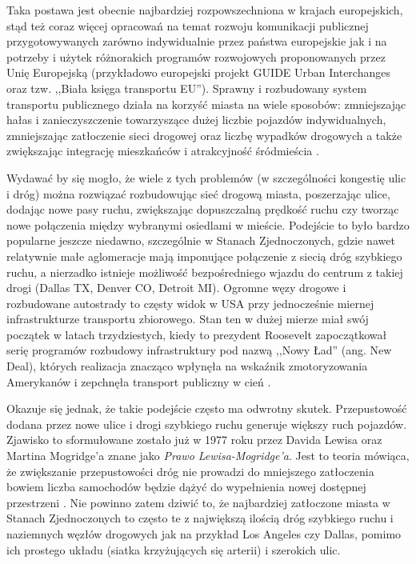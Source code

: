 \documentclass[twoside,12pt]{article}
\begin{document}
	Taka postawa jest obecnie najbardziej rozpowszechniona w krajach europejskich, stąd też coraz więcej opracowań na temat rozwoju komunikacji publicznej przygotowywanych zarówno indywidualnie przez państwa europejskie jak i na potrzeby i użytek różnorakich programów rozwojowych proponowanych przez Unię Europejską (przykładowo europejski projekt GUIDE Urban Interchanges oraz tzw. ,,Biała księga transportu EU''). Sprawny i rozbudowany system transportu publicznego działa na korzyść miasta na wiele sposobów: zmniejszając hałas i zanieczyszczenie towarzyszące dużej liczbie pojazdów indywidualnych, zmniejszając zatłoczenie sieci drogowej oraz liczbę wypadków drogowych \cite{szarata} a także zwiększając integrację mieszkańców i atrakcyjność śródmieścia \cite{guide}.  
	
	Wydawać by się mogło, że wiele z tych problemów (w szczególności kongestię ulic i dróg) można rozwiązać rozbudowując sieć drogową miasta, poszerzając ulice, dodając nowe pasy ruchu, zwiększając dopuszczalną prędkość ruchu czy tworząc nowe połączenia między wybranymi osiedlami w mieście. Podejście to było bardzo popularne jeszcze niedawno, szczególnie w Stanach Zjednoczonych, gdzie nawet relatywnie małe aglomeracje mają imponujące połączenie z siecią dróg szybkiego ruchu, a nierzadko istnieje możliwość bezpośredniego wjazdu do centrum z takiej drogi (Dallas TX, Denver CO, Detroit MI). Ogromne węzy drogowe i rozbudowane autostrady to częsty widok w USA przy jednocześnie miernej infrastrukturze transportu zbiorowego. Stan ten w dużej mierze miał swój początek w latach trzydziestych, kiedy to prezydent Roosevelt zapoczątkował serię programów rozbudowy infrastruktury pod nazwą ,,Nowy Ład'' (ang. New Deal), których realizacja znacząco wpłynęła na wskaźnik zmotoryzowania Amerykanów i zepchnęła transport publiczny w cień \cite{makarova}.

	Okazuje się jednak, że takie podejście często ma odwrotny skutek. Przepustowość dodana przez nowe ulice i drogi szybkiego ruchu generuje większy ruch pojazdów. Zjawisko to sformułowane zostało już w 1977 roku przez Davida Lewisa oraz Martina Mogridge'a znane jako \emph{Prawo Lewisa-Mogridge'a}. Jest to teoria mówiąca, że zwiększanie przepustowości dróg nie prowadzi do mniejszego zatłoczenia bowiem liczba samochodów będzie dążyć do wypełnienia nowej dostępnej przestrzeni \cite{prawo-lewisa}. Nie powinno zatem dziwić to, że najbardziej zatłoczone miasta w Stanach Zjednoczonych to często te z największą ilością dróg szybkiego ruchu i naziemnych węzłów drogowych jak na przykład Los Angeles czy Dallas, pomimo ich prostego układu (siatka krzyżujących się arterii) i szerokich ulic.
	
\end{document}
